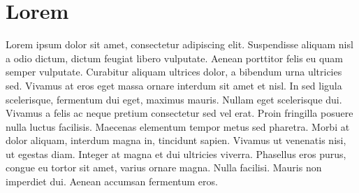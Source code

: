 \section{Lorem}\label{lorem}
Lorem ipsum dolor sit amet, consectetur adipiscing elit. Suspendisse aliquam nisl a odio dictum, dictum feugiat libero vulputate. Aenean porttitor felis eu quam semper vulputate. Curabitur aliquam ultrices dolor, a bibendum urna ultricies sed. Vivamus at eros eget massa ornare interdum sit amet et nisl. In sed ligula scelerisque, fermentum dui eget, maximus mauris. Nullam eget scelerisque dui. Vivamus a felis ac neque pretium consectetur sed vel erat. Proin fringilla posuere nulla luctus facilisis. Maecenas elementum tempor metus sed pharetra. Morbi at dolor aliquam, interdum magna in, tincidunt sapien. Vivamus ut venenatis nisi, ut egestas diam. Integer at magna et dui ultricies viverra. Phasellus eros purus, congue eu tortor sit amet, varius ornare magna. Nulla facilisi. Mauris non imperdiet dui. Aenean accumsan fermentum eros.

